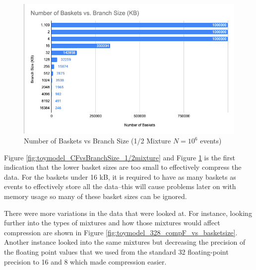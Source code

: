 \begin{figure}[h]
    \centering
    \includegraphics[width=.8\textwidth]{content/toymodel_content/Number of Baskets vs Branch Size.png}
    \caption{Number of Baskets vs Branch Size (1/2 Mixture $N=10^6$ events)}
    \label{fig:toymodel_NumBasketsvsBranchSize_1/2mixture}
\end{figure}

Figure \ref{fig:toymodel_CFvsBranchSize_1/2mixture} and Figure \ref{fig:toymodel_NumBasketsvsBranchSize_1/2mixture} is the first indication that the lower basket sizes are too small to effectively compress the data. 
For the baskets under 16 kB, it is required to have as many baskets as events to effectively store all the data--this will cause problems later on with memory usage so many of these basket sizes can be ignored.

There were more variations in the data that were looked at. 
For instance, looking further into the types of mixtures and how those mixtures would affect compression are shown in Figure \ref{fig:toymodel_328_compF_vs_basketsize}. 
Another instance looked into the same mixtures but decreasing the precision of the floating point values that we used from the standard 32 floating-point precision to 16 and 8 which made compression easier. 

